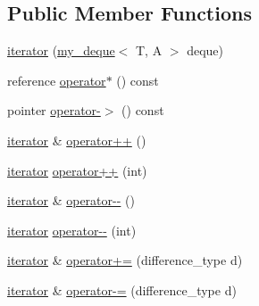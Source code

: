\subsection*{Public Member Functions}
\begin{DoxyCompactItemize}
\item 
\hyperlink{classmy__deque_1_1iterator_a9e89f763f9bc57b554854ec55ef1e29a}{iterator} (\hyperlink{classmy__deque}{my\-\_\-deque}$<$ T, A $>$ deque)
\item 
reference \hyperlink{classmy__deque_1_1iterator_a12632f02814bba64ca79f42edc0e1497}{operator$\ast$} () const 
\item 
pointer \hyperlink{classmy__deque_1_1iterator_a064f5b1faf5a72113083425133de9a41}{operator-\/$>$} () const 
\item 
\hyperlink{classmy__deque_1_1iterator}{iterator} \& \hyperlink{classmy__deque_1_1iterator_ab2a00619614e204eedb184112a56016e}{operator++} ()
\item 
\hyperlink{classmy__deque_1_1iterator}{iterator} \hyperlink{classmy__deque_1_1iterator_a57f6ac4aef7215ca67b6e05eeda29ee4}{operator++} (int)
\item 
\hyperlink{classmy__deque_1_1iterator}{iterator} \& \hyperlink{classmy__deque_1_1iterator_a278cab96c03498e55ba1aa4e05f1538e}{operator-\/-\/} ()
\item 
\hyperlink{classmy__deque_1_1iterator}{iterator} \hyperlink{classmy__deque_1_1iterator_a5bef4b6332aecf7dcda57cee9a1fdc70}{operator-\/-\/} (int)
\item 
\hyperlink{classmy__deque_1_1iterator}{iterator} \& \hyperlink{classmy__deque_1_1iterator_ad17b4f6e8be4d8242ad4572d62beff82}{operator+=} (difference\-\_\-type d)
\item 
\hyperlink{classmy__deque_1_1iterator}{iterator} \& \hyperlink{classmy__deque_1_1iterator_a13c056d48543734a23a9de09fd652868}{operator-\/=} (difference\-\_\-type d)
\end{DoxyCompactItemize}
